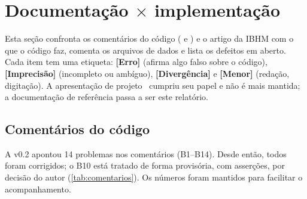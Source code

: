 \section{Documentação \texorpdfstring{$\times$}{x} implementação}
\label{sec:documentacao}

Esta seção confronta os comentários do código ( e ) e o artigo da IBHM
com o que o código faz, comenta os arquivos de dados e lista os defeitos em aberto. Cada item tem uma etiqueta:
\textbf{[Erro]} (afirma algo falso sobre o código), \textbf{[Imprecisão]} (incompleto ou ambíguo), \textbf{[Divergência]}
e \textbf{[Menor]} (redação, digitação). A apresentação de projeto~\cite{slides} cumpriu seu papel e não é mais mantida; a
documentação de referência passa a ser este relatório.

\subsection{Comentários do código}

A v0.2 apontou 14 problemas nos comentários (B1--B14). Desde então, todos foram corrigidos; o B10 está tratado de forma
provisória, com asserções, por decisão do autor (\cref{tab:comentarios}). Os números foram mantidos para facilitar o acompanhamento.


